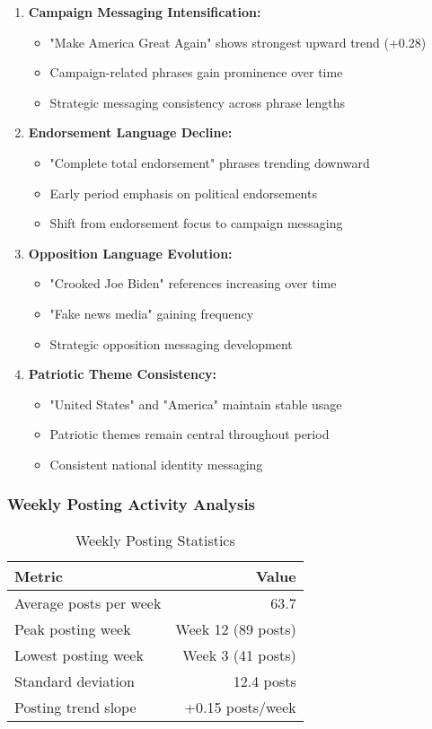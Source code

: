 \documentclass[12pt,a4paper]{article}
\begin{document}
\begin{enumerate}
\item \textbf{Campaign Messaging Intensification:}
   \begin{itemize}
   \item "Make America Great Again" shows strongest upward trend (+0.28)
   \item Campaign-related phrases gain prominence over time
   \item Strategic messaging consistency across phrase lengths
   \end{itemize}

\item \textbf{Endorsement Language Decline:}
   \begin{itemize}
   \item "Complete total endorsement" phrases trending downward
   \item Early period emphasis on political endorsements
   \item Shift from endorsement focus to campaign messaging
   \end{itemize}

\item \textbf{Opposition Language Evolution:}
   \begin{itemize}
   \item "Crooked Joe Biden" references increasing over time
   \item "Fake news media" gaining frequency
   \item Strategic opposition messaging development
   \end{itemize}

\item \textbf{Patriotic Theme Consistency:}
   \begin{itemize}
   \item "United States" and "America" maintain stable usage
   \item Patriotic themes remain central throughout period
   \item Consistent national identity messaging
   \end{itemize}
\end{enumerate}

\subsubsection{Weekly Posting Activity Analysis}

\begin{table}[H]
\centering
\caption{Weekly Posting Statistics}
\begin{tabular}{@{}lr@{}}
\toprule
\textbf{Metric} & \textbf{Value} \\
\midrule
Average posts per week & 63.7 \\
Peak posting week & Week 12 (89 posts) \\
Lowest posting week & Week 3 (41 posts) \\
Standard deviation & 12.4 posts \\
Posting trend slope & +0.15 posts/week \\
\bottomrule
\end{tabular}
\end{table}
\end{document}
